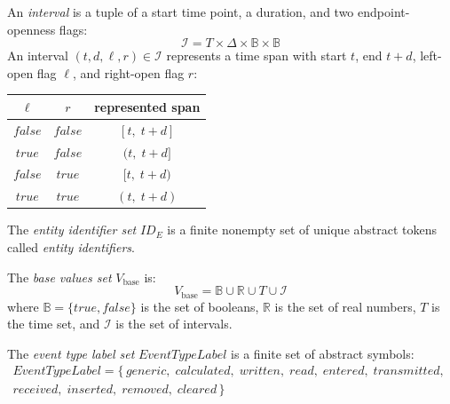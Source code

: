 \begin{definition}[Interval]\label{def:interval}
    An \emph{interval} is a tuple of a start time point, a duration, and two endpoint-openness flags:
    \[
        \mathcal{I} = T \times \Delta \times \mathbb{B} \times \mathbb{B}
    \]
    An interval $(t, d, \ell, r) \in \mathcal{I}$ represents a time span with start $t$, end $t+d$, left-open flag $\ell$, and right-open flag $r$:
    \begin{center}
        \begin{tabular}{ccc}
            \toprule
            $\ell$           & $r$              & represented span \\
            \midrule
            $\mathit{false}$ & $\mathit{false}$ & $[t,\; t+d]$     \\
            $\mathit{true}$  & $\mathit{false}$ & $(t,\; t+d]$     \\
            $\mathit{false}$ & $\mathit{true}$  & $[t,\; t+d)$     \\
            $\mathit{true}$  & $\mathit{true}$  & $(t,\; t+d)$     \\
            \bottomrule
        \end{tabular}
    \end{center}
\end{definition}

\begin{definition}\label{def:entity_id_set}
    The \emph{entity identifier set} $\mathit{ID}_E$ is a finite nonempty set of unique abstract tokens called \emph{entity identifiers}.
\end{definition}

\begin{definition}\label{def:base_values}
    The \emph{base values set} $V_{\text{base}}$ is:
    \[
        V_{\text{base}} = \mathbb{B} \cup \mathbb{R} \cup T \cup \mathcal{I}
    \]
    where $\mathbb{B} = \{\mathit{true}, \mathit{false}\}$ is the set of booleans, $\mathbb{R}$ is the set of real numbers, $T$ is the time set, and $\mathcal{I}$ is the set of intervals.
\end{definition}

\begin{definition}\label{def:event_type_label_set}
    The \emph{event type label set} $\mathit{EventTypeLabel}$ is a finite set of abstract symbols:
    \begin{gather*}
        \mathit{EventTypeLabel} = \{\,
        \mathit{generic},\;
        \mathit{calculated},\;
        \mathit{written},\;
        \mathit{read},\;
        \mathit{entered},\;
        \mathit{transmitted},\; \\
        \mathit{received},\;
        \mathit{inserted},\;
        \mathit{removed},\;
        \mathit{cleared}
        \,\}
    \end{gather*}
\end{definition}

